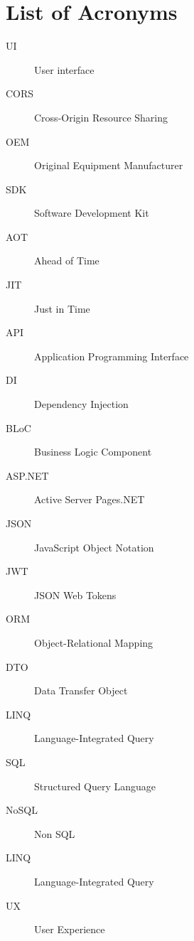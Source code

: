 \chapter{List of Acronyms}
\label{chapter:acronyms}


\begin{description}
	\item[UI] User interface
	\item[CORS] Cross-Origin Resource Sharing
	\item[OEM] Original Equipment Manufacturer
	\item[SDK] Software Development Kit
	\item[AOT] Ahead of Time
	\item[JIT] Just in Time
	\item[API] Application Programming Interface
	\item[DI] Dependency Injection 
	\item[BLoC] Business Logic Component 
	\item[ASP.NET] Active Server Pages.NET
	\item[JSON] JavaScript Object Notation
	\item[JWT] JSON Web Tokens 
	\item[ORM] Object-Relational Mapping
	\item[DTO] Data Transfer Object  
	\item[LINQ] Language-Integrated Query 
	\item[SQL] Structured Query Language
	\item[NoSQL] Non SQL 
	\item[LINQ] Language-Integrated Query
	\item[UX] User Experience  
\end{description}
